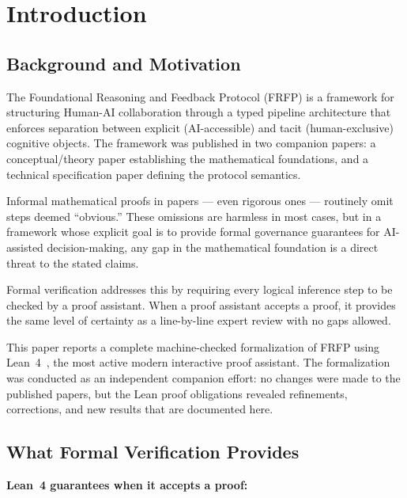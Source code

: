 \section{Introduction}
\label{ch:intro}

\subsection{Background and Motivation}

The Foundational Reasoning and Feedback Protocol (FRFP) is a framework for
structuring Human-AI collaboration through a typed pipeline architecture that
enforces separation between explicit (AI-accessible) and tacit
(human-exclusive) cognitive objects. The framework was published in two companion
papers: a conceptual/theory paper establishing the mathematical foundations, and a
technical specification paper defining the protocol semantics.

Informal mathematical proofs in papers --- even rigorous ones --- routinely omit
steps deemed ``obvious.'' These omissions are harmless in most cases, but in a
framework whose explicit goal is to provide formal governance guarantees for
AI-assisted decision-making, any gap in the mathematical foundation is a direct
threat to the stated claims.

Formal verification addresses this by requiring every logical inference step to be
checked by a proof assistant. When a proof assistant accepts a proof, it provides
the same level of certainty as a line-by-line expert review with no gaps allowed.

This paper reports a complete machine-checked formalization of FRFP using Lean~4~\cite{deMoura2021Lean4},
the most active modern interactive proof assistant. The formalization was conducted
as an independent companion effort: no changes were made to the published papers,
but the Lean proof obligations revealed refinements, corrections, and new results
that are documented here.

\subsection{What Formal Verification Provides}

\textbf{Lean~4 guarantees when it accepts a proof:}

